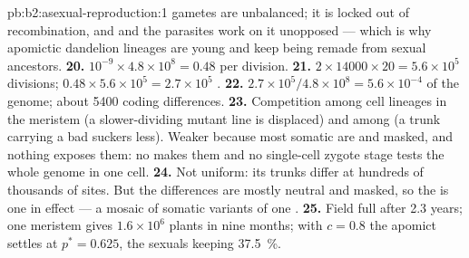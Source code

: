 \begin{solution}{pb:b2:asexual-reproduction:1}
gametes are unbalanced; it is locked out of recombination, and
 and the parasites work on it unopposed --- which is
why apomictic dandelion lineages are young and keep being remade
from sexual ancestors.
\textbf{20.} $10^{-9}\times 4.8\times 10^{8} = 0.48$ per division.
\textbf{21.} $2\times \num{14000}\times 20 = 5.6\times 10^{5}$
divisions; $0.48\times 5.6\times 10^{5} = 2.7\times 10^{5}$
.
\textbf{22.} $2.7\times 10^{5}/4.8\times 10^{8} = 5.6\times 10^{-4}$ of
the genome; about \num{5400} coding differences.
\textbf{23.} Competition among cell lineages in the meristem (a
slower-dividing mutant line is displaced) and among  (a trunk
carrying a bad  suckers less). Weaker because most somatic
 are  and masked, and nothing exposes them:
no  makes them  and no single-cell zygote stage
tests the whole genome in one cell.
\textbf{24.} Not uniform: its trunks differ at hundreds of thousands
of sites. But the differences are mostly neutral and masked, so the
 is one  in effect --- a mosaic of somatic variants of
one .
\textbf{25.} Field full after 2.3 years; one meristem gives
$1.6\times 10^{6}$ plants in nine months; with $c = 0.8$ the apomict
settles at $p^* = 0.625$, the sexuals keeping \qty{37.5}{\%}.
\end{solution}
